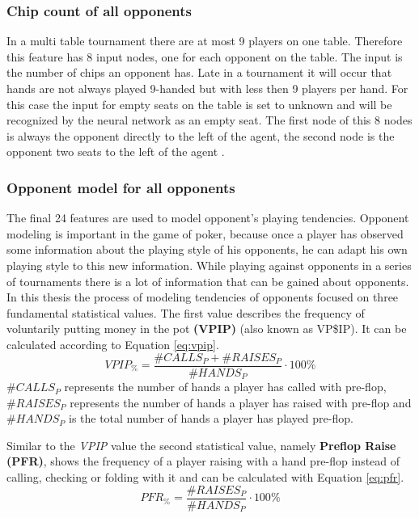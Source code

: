 \subsubsection{Chip count of all opponents}
In a  multi table tournament there are at most 9 players on one table. Therefore this feature has 8 input nodes, one for each opponent on the table. The input is the number of chips an opponent has. Late in a tournament it will occur that hands are not always played 9-handed but with less then 9 players per hand. For this case the input for empty seats on the table is set to unknown and will be recognized by the neural network as an empty seat. The first node of this 8 nodes is always the opponent directly to the left of the agent, the second node is the opponent two seats to the left of the agent \cite{evolutionary_methods}. 
\subsubsection{Opponent model for all opponents}
The final 24 features are used to model opponent's playing tendencies. Opponent modeling is important in the game of poker, because once a player has observed some information about the playing style of his opponents, he can adapt his own playing style to this new information. While playing against opponents in a series of tournaments there is a lot of information that can be gained about opponents. In this thesis the process of modeling tendencies of opponents focused on three fundamental statistical values. The first value describes the frequency of voluntarily putting money in the pot \textbf{(VPIP)} (also known as VP\$IP). It can be calculated according to Equation \ref{eq:vpip}.
\begin{equation}
\label{eq:vpip}
VPIP_{\%} = \frac{\#CALLS_{P} + \#RAISES_{P}}{\#HANDS_{P}} \cdot 100\%
\end{equation}
$\#CALLS_{P}$ represents the number of hands a player has called with pre-flop, $\#RAISES_{P}$ represents the number of hands a player has raised with pre-flop and $\#HANDS_{P}$ is the total number of hands a player has played pre-flop.\par
Similar to the \textit{VPIP} value the second statistical value, namely \textbf{Preflop Raise (PFR)}, shows the frequency of a player raising with a hand pre-flop instead of calling, checking or folding with it and can be calculated with Equation \ref{eq:pfr}.
\begin{equation}
\label{eq:pfr}
PFR_{\%} = \frac{\#RAISES_{P}}{\#HANDS_{P}}  \cdot 100\%
\end{equation}
